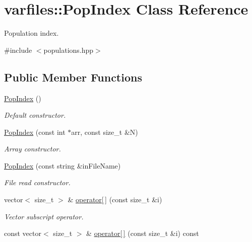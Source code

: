 \hypertarget{classvarfiles_1_1_pop_index}{}\section{varfiles\+:\+:Pop\+Index Class Reference}
\label{classvarfiles_1_1_pop_index}


Population index.  




{\ttfamily \#include $<$populations.\+hpp$>$}

\subsection*{Public Member Functions}
\begin{DoxyCompactItemize}
\item 
\mbox{\label{classvarfiles_1_1_pop_index_a72ef40022d37b1d0883a5a18922a5570}} 
\hyperlink{classvarfiles_1_1_pop_index_a72ef40022d37b1d0883a5a18922a5570}{Pop\+Index} ()
\begin{DoxyCompactList}\small\item\em Default constructor. \end{DoxyCompactList}\item 
\hyperlink{classvarfiles_1_1_pop_index_a27367217cfb5f85abda425baa1d755b9}{Pop\+Index} (const int $\ast$arr, const size\+\_\+t \&N)
\begin{DoxyCompactList}\small\item\em Array constructor. \end{DoxyCompactList}\item 
\hyperlink{classvarfiles_1_1_pop_index_aaf4cec726d9befe823c7d6ff4d36d5ce}{Pop\+Index} (const string \&in\+File\+Name)
\begin{DoxyCompactList}\small\item\em File read constructor. \end{DoxyCompactList}\item 
vector$<$ size\+\_\+t $>$ \& \hyperlink{classvarfiles_1_1_pop_index_a0ed15441299f7745efb8299cf1c33407}{operator\mbox{[}$\,$\mbox{]}} (const size\+\_\+t \&i)
\begin{DoxyCompactList}\small\item\em Vector subscript operator. \end{DoxyCompactList}\item 
const vector$<$ size\+\_\+t $>$ \& \hyperlink{classvarfiles_1_1_pop_index_a017523f67cee8c42cf0f51ea21a5aebf}{operator\mbox{[}$\,$\mbox{]}} (const size\+\_\+t \&i) const

\end{DoxyCompactItemize}
